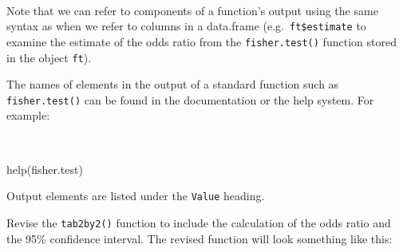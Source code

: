 \documentclass[
  12pt,
]{book}
\newenvironment{Shaded}{\begin{snugshade}}{\end{snugshade}}
\newcommand{\FunctionTok}[1]{\textcolor[rgb]{0.00,0.00,0.00}{#1}}
\newcommand{\NormalTok}[1]{#1}
\begin{document}
~

Note that we can refer to components of a function's output using the same syntax as when we refer to columns in a data.frame (e.g.~\texttt{ft\$estimate} to examine the estimate of the odds ratio from the \texttt{fisher.test()} function stored in the object \texttt{ft}).

The names of elements in the output of a standard function such as \texttt{fisher.test()} can be found in the documentation or the help system. For example:

~

\begin{Shaded}
\begin{Highlighting}[]
\FunctionTok{help}\NormalTok{(fisher.test)}
\end{Highlighting}
\end{Shaded}

\newpage

Output elements are listed under the \texttt{Value} heading.

Revise the \texttt{tab2by2()} function to include the calculation of the odds ratio and the 95\% confidence interval. The revised function will look something like this:

~
\end{document}
